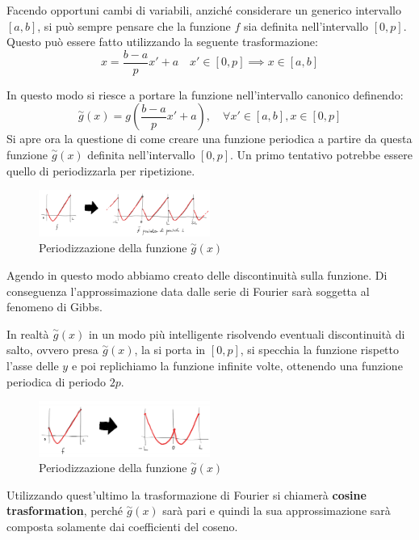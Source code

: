Facendo opportuni cambi di variabili, anziché considerare un generico intervallo
$[a, b]$, si può sempre pensare che la funzione $f$ sia definita nell'intervallo
$[0, p]$. Questo può essere fatto utilizzando la seguente trasformazione:
\begin{equation}
    x = \frac{b - a}{p} x' + a \quad x' \in [0, p] \implies x \in [a, b]
\end{equation}

In questo modo si riesce a portare la funzione nell'intervallo canonico definendo:
\begin{equation*}
    \stackrel{\sim}{g}(x) = g\left(\frac{b-a}{p}x'+a\right), \quad \forall x' \in [a,b], x \in [0,p]
\end{equation*}
Si apre ora la questione di come creare una funzione periodica a partire da questa
funzione $\stackrel{\sim}{g}(x)$ definita nell'intervallo $[0, p]$. Un primo
tentativo potrebbe essere quello di periodizzarla per ripetizione.
\begin{figure}[!ht]
    \centering
    \includegraphics[width=0.5\textwidth]{img/Serie/ripetizione.png}
    \caption{Periodizzazione della funzione $\stackrel{\sim}{g}(x)$}
    \label{fig:ripetizione}
\end{figure}

Agendo in questo modo abbiamo creato delle discontinuità sulla funzione. Di conseguenza
l'approssimazione data dalle serie di Fourier sarà soggetta al fenomeno di Gibbs.

In realtà $\stackrel{\sim}{g}(x)$ in un modo più intelligente risolvendo eventuali
discontinuità di salto, ovvero presa $\stackrel{\sim}{g}(x)$, la si porta in $[0,p]$,
si specchia la funzione rispetto l'asse delle $y$ e poi replichiamo la funzione
infinite volte, ottenendo una funzione periodica di periodo $2p$.
\begin{figure}[!ht]
    \centering
    \includegraphics[width=0.5\textwidth]{img/Serie/specchio.png}
    \caption{Periodizzazione della funzione $\stackrel{\sim}{g}(x)$}
    \label{fig:specchio}
\end{figure}
Utilizzando quest'ultimo la trasformazione di Fourier si chiamerà \textbf{cosine trasformation},
perché $\stackrel{\sim}{g}(x)$ sarà pari e quindi la sua approssimazione sarà
composta solamente dai coefficienti del coseno.

